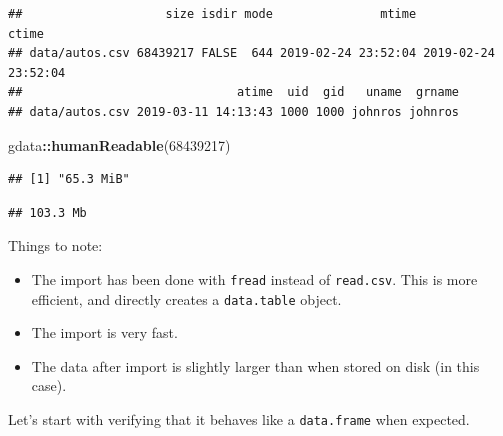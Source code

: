 \documentclass[]{book}
\newenvironment{Shaded}{\begin{snugshade}}{\end{snugshade}}
\newcommand{\KeywordTok}[1]{\textcolor[rgb]{0.13,0.29,0.53}{\textbf{#1}}}
\newcommand{\DataTypeTok}[1]{\textcolor[rgb]{0.13,0.29,0.53}{#1}}
\newcommand{\DecValTok}[1]{\textcolor[rgb]{0.00,0.00,0.81}{#1}}
\newcommand{\StringTok}[1]{\textcolor[rgb]{0.31,0.60,0.02}{#1}}
\newcommand{\CommentTok}[1]{\textcolor[rgb]{0.56,0.35,0.01}{\textit{#1}}}
\newcommand{\OperatorTok}[1]{\textcolor[rgb]{0.81,0.36,0.00}{\textbf{#1}}}
\newcommand{\NormalTok}[1]{#1}
\providecommand{\tightlist}{%
  \setlength{\itemsep}{0pt}\setlength{\parskip}{0pt}}
\theoremstyle{definition}
\theoremstyle{definition}
\theoremstyle{definition}
\theoremstyle{remark}
\begin{document}
\begin{verbatim}
##                    size isdir mode               mtime               ctime
## data/autos.csv 68439217 FALSE  644 2019-02-24 23:52:04 2019-02-24 23:52:04
##                              atime  uid  gid   uname  grname
## data/autos.csv 2019-03-11 14:13:43 1000 1000 johnros johnros
\end{verbatim}

\begin{Shaded}
\begin{Highlighting}[]
\NormalTok{gdata}\OperatorTok{::}\KeywordTok{humanReadable}\NormalTok{(}\DecValTok{68439217}\NormalTok{)}
\end{Highlighting}
\end{Shaded}

\begin{verbatim}
## [1] "65.3 MiB"
\end{verbatim}

\begin{Shaded}
\end{Shaded}

\begin{verbatim}
## 103.3 Mb
\end{verbatim}

Things to note:

\begin{itemize}
\tightlist
\item
  The import has been done with \texttt{fread} instead of
  \texttt{read.csv}. This is more efficient, and directly creates a
  \texttt{data.table} object.
\item
  The import is very fast.
\item
  The data after import is slightly larger than when stored on disk (in
  this case).
\end{itemize}

Let's start with verifying that it behaves like a \texttt{data.frame}
when expected.

\begin{Shaded}
\end{Shaded}
\end{document}
